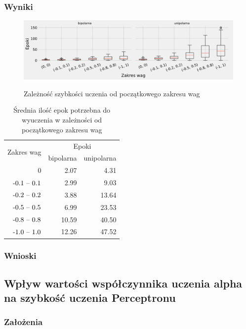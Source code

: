 \documentclass{article}
\begin{document}
\subsubsection*{Wyniki}
\begin{figure}[h]
	\centering
	\caption{Zależność szybkości uczenia od początkowego zakresu wag}
	\includegraphics[width=\textwidth]{per_w.png}
	\label{fig:res2}
\end{figure}

\begin{table}[h]
	\caption{Średnia ilość epok potrzebna do wyuczenia w zależności od początkowego zakresu wag}
	\label{tabela-res-2}
	\centering
	\begin{tabular}{rrr}
		\toprule
		\multirow{2}{*}{Zakres wag}   & \multicolumn{2}{c}{Epoki} \\
		                  & bipolarna & unipolarna \\
		\midrule
		0                 & 2.07      & 4.31       \\
		\($-0.1 -- 0.1$\) & 2.99      & 9.03       \\
		\($-0.2 -- 0.2$\) & 3.88      & 13.64      \\
		\($-0.5 -- 0.5$\) & 6.99      & 23.53      \\
		\($-0.8 -- 0.8$\) & 10.59     & 40.50      \\
		\($-1.0 -- 1.0$\) & 12.26     & 47.52      \\
		\bottomrule
	\end{tabular}
\end{table}

\subsubsection*{Wnioski}


\newpage
\subsection{Wpływ wartości współczynnika uczenia alpha na szybkość uczenia Perceptronu}
\subsubsection*{Założenia}
\end{document}
